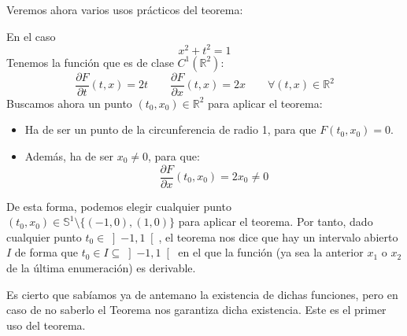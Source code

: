 Veremos ahora varios usos prácticos del teorema:
\begin{ejemplo}
    En el caso
    \begin{equation*}
        x^2+t^2 = 1
    \end{equation*}
    Tenemos la función 
    que es de clase $C^1(\mathbb{R}^2)$:
    \begin{equation*}
        \dfrac{\partial F}{\partial t}(t,x) = 2t \qquad \dfrac{\partial F}{\partial x}(t,x) = 2x \qquad \forall (t,x)\in \mathbb{R}^2
    \end{equation*}
    Buscamos ahora un punto $(t_0,x_0)\in \mathbb{R}^2$ para aplicar el teorema:
    \begin{itemize}
        \item Ha de ser un punto de la circunferencia de radio 1, para que $F(t_0,x_0)=0$.
        \item Además, ha de ser $x_0 \neq 0$, para que:
            \begin{equation*}
                \dfrac{\partial F}{\partial x}(t_0,x_0) = 2x_0 \neq 0
            \end{equation*}
    \end{itemize}
    De esta forma, podemos elegir cualquier punto $(t_0,x_0)\in \mathbb{S}^1\setminus \{(-1,0),(1,0)\}$ para aplicar el teorema. Por tanto, dado cualquier punto $t_0\in \left]-1,1\right[$, el teorema nos dice que hay un intervalo abierto $I$ de forma que $t_0\in I \subseteq \left]-1,1\right[$ en el que la función (ya sea la anterior $x_1$ o $x_2$ de la última enumeración) es derivable.

    Es cierto que sabíamos ya de antemano la existencia de dichas funciones, pero en caso de no saberlo el Teorema nos garantiza dicha existencia. Este es el primer uso del teorema.
\end{ejemplo}

